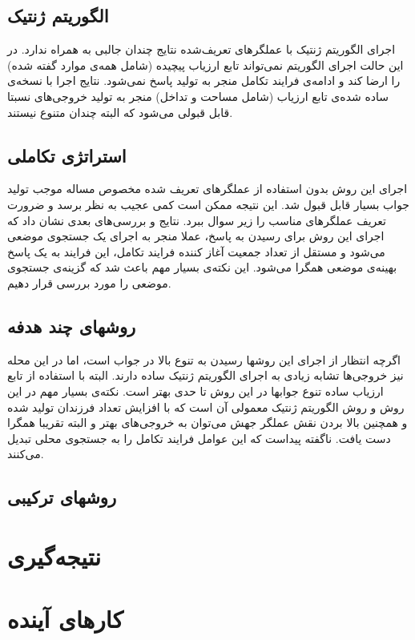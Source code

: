 \documentclass{report}
\begin{document}
\subsection{الگوریتم ژنتیک}
اجرای الگوریتم ژنتیک با عملگرهای تعریف‌شده نتایج چندان جالبی به همراه ندارد. در این حالت اجرای الگوریتم نمی‌تواند تابع ارزیاب پیچیده (شامل همه‌ی موارد گفته شده) را ارضا کند و ادامه‌ی فرایند تکامل منجر به تولید پاسخ نمی‌شود. نتایج اجرا با نسخه‌ی ساده شده‌ی تابع ارزیاب (شامل مساحت و تداخل) منجر به تولید خروجی‌های نسبتا قابل قبولی می‌شود که البته چندان متنوع نیستند.

\subsection{استراتژی تکاملی}
اجرای این روش بدون استفاده از عملگرهای تعریف شده مخصوص مساله موجب تولید جواب بسیار قابل قبول شد. این نتیجه ممکن است کمی عجیب به نظر برسد و ضرورت تعریف عملگرهای مناسب را زیر سوال ببرد. نتایج و بررسی‌های بعدی نشان داد که اجرای این روش برای رسیدن به پاسخ، عملا منجر به اجرای یک جستجوی موضعی می‌شود و مستقل از تعداد جمعیت آغاز کننده فرایند تکامل، این فرایند به یک پاسخ بهینه‌ی موضعی همگرا می‌شود. این نکته‌ی بسیار مهم باعث شد که گزینه‌ی جستجوی موضعی را مورد بررسی قرار دهیم.

\subsection{روشهای چند هدفه}
اگرچه انتظار از اجرای این روشها رسیدن به تنوع بالا در جواب است، اما در این محله نیز خروجی‌ها تشابه زیادی به اجرای الگوریتم ژنتیک ساده دارند. البته با استفاده از تابع ارزیاب ساده تنوع جوابها در این روش تا حدی بهتر است.
نکته‌ی بسیار مهم در این روش و روش الگوریتم ژنتیک معمولی آن است که با افزایش تعداد فرزندان تولید شده و همچنین بالا بردن نقش عملگر جهش می‌توان به خروجی‌های بهتر و البته تقریبا همگرا دست یافت. ناگفته پیداست که این عوامل فرایند تکامل را به جستجوی محلی تبدیل می‌کنند.

\subsection{روشهای ترکیبی}


\section{نتیجه‌گیری}

\section{کارهای آینده}



\end{document}
